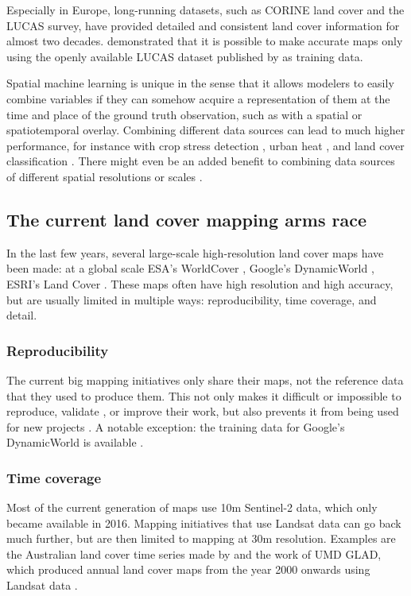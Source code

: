         Especially in Europe, long-running datasets, such as CORINE land cover and the LUCAS survey, have provided detailed and consistent land cover information for almost two decades. \citet{pflugmacher2019mapping} demonstrated that it is possible to make accurate maps only using the openly available LUCAS dataset published by \citet{dandrimont2020harmonised} as training data.
        
        Spatial machine learning is unique in the sense that it allows modelers to easily combine variables if they can somehow acquire a representation of them at the time and place of the ground truth observation, such as with a spatial or spatiotemporal overlay. Combining different data sources can lead to much higher performance, for instance with crop stress detection  \citep{berger2022multi}, urban heat \citep{shahi2015novel}, and land cover classification \citep{zhu2016optimizing, hurskainen2019auxiliary, hosseiny2022urban}. There might even be an added benefit to combining data sources of different spatial resolutions or scales \citep{santos2012multiscale}.
    
\subsection*{The current land cover mapping arms race}
    
    In the last few years, several large-scale high-resolution land cover maps have been made: at a global scale ESA's WorldCover \citep{kerchove2021esa}, Google's DynamicWorld \citep{brown2022dynamic}, ESRI's Land Cover \citep{karra2021global}.
    These maps often have high resolution and high accuracy, but are usually limited in multiple ways: reproducibility, time coverage, and detail.
    
    \subsubsection{Reproducibility}
        The current big mapping initiatives only share their maps, not the reference data that they used to produce them. This not only makes it difficult or impossible to reproduce, validate \citep{venter2022global}, or improve their work, but also prevents it from being used for new projects \citep{tsendbazar2015assessing}.  A notable exception: the training data for Google's DynamicWorld \citet{brown2022dynamic} is available \citep{tait2021dwtd}.
    
    \subsubsection{Time coverage} 
        Most of the current generation of maps use 10m  Sentinel-2 data, which only became available in 2016. Mapping initiatives that use Landsat data can go back much further, but are then limited to mapping at 30m resolution. Examples are the Australian land cover time series made by \citep{calderon2021high} and the work of UMD GLAD, which produced annual land cover maps from the year 2000 onwards using Landsat data \citep{hansen2022global}.

